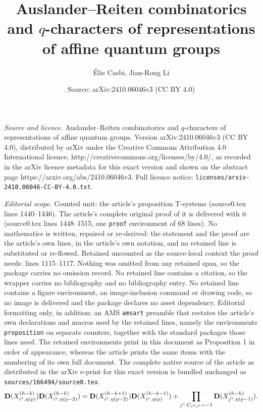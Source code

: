 \documentclass[10pt,a4paper]{amsart}
\title{Auslander--Reiten combinatorics and $q$-characters of representations of affine quantum groups}
\author{\'Elie Casbi, Jian-Rong Li}
\date{Source: arXiv:2410.06046v3 (CC BY 4.0)}
\begin{document}
\maketitle

\noindent\emph{Source and licence.} Auslander--Reiten combinatorics and $q$-characters of representations of affine quantum groups. Version arXiv:2410.06046v3 (CC BY 4.0), distributed by arXiv under the Creative Commons Attribution 4.0 International licence, http://creativecommons.org/licenses/by/4.0/, as recorded in the arXiv licence metadata for this exact version and shown on the abstract page https://arxiv.org/abs/2410.06046v3. Full licence notice: \texttt{licenses/arxiv-2410.06046-CC-BY-4.0.txt}.\par\smallskip

\noindent\textit{Editorial scope.} Counted unit: the article's proposition T-systems (source0.tex lines 1440--1446). The article's complete original proof of it is delivered with it (source0.tex lines 1448--1515, one \texttt{proof} environment of 68 lines). No mathematics is written, repaired or re-derived: the statement and the proof are the article's own lines, in the article's own notation, and no retained line is substituted or re-flowed.  Retained uncounted as the source-local context the proof needs: lines 1115--1117.  Nothing was omitted from any retained span, so the package carries no omission record.  No retained line contains a citation, so the wrapper carries no bibliography and no bibliography entry.  No retained line contains a figure environment, an image-inclusion command or drawing code, so no image is delivered and the package declares no asset dependency.  Editorial formatting only, in addition: an AMS \texttt{amsart} preamble that restates the article's own declarations and macros used by the retained lines, namely the environments \texttt{proposition} on separate counters, together with the standard packages those lines need.  The retained environments print in this document as Proposition 1 in order of appearance, whereas the article prints the same items with the numbering of its own full document.  The complete native source of the article as distributed in the arXiv e-print for this exact version is bundled unchanged as \texttt{sources/166494/source0.tex}.
\begin{align} \label{eq:apply bD to T-system on Qstar side which correspond to first two copies of CQ on Q side}
{\bf D}(X_{i^*, \eta(p)}^{(h-k)}) {\bf D}(X_{i^*, \eta(p-2)}^{(h-k)}) = {\bf D}(X_{i^*, \eta(p-2)}^{(h-k+1)}) {\bf D}(X_{i^*, \eta(p)}^{(h-k-1)}) + \prod_{j^*:C_{i^*j^*}=-1} {\bf D}(X_{j^*, \eta(p-1)}^{(h-k)}).  
\end{align}
\end{document}
